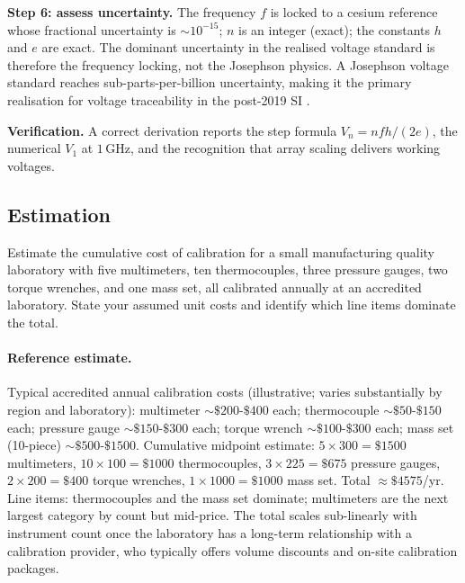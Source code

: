 \begin{exercise}
\textbf{Step 6: assess uncertainty.} The frequency $f$ is locked to
a cesium reference whose fractional uncertainty is $\sim 10^{-15}$;
$n$ is an integer (exact); the constants $h$ and $e$ are exact.
The dominant uncertainty in the realised voltage standard is
therefore the frequency locking, not the Josephson physics. A
Josephson voltage standard reaches sub-parts-per-billion uncertainty,
making it the primary realisation for voltage traceability in the
post-2019 SI \cite{std:bipm-si2019}.

\textbf{Verification.} A correct derivation reports the step
formula $V_{n} = nfh/(2e)$, the numerical $V_{1}$ at $1 \,\text{
GHz}$, and the recognition that array scaling delivers working
voltages.
\end{exercise}

\subsection*{Estimation}

\begin{exercise}
Estimate the cumulative cost of calibration for a small
manufacturing quality laboratory with five multimeters, ten
thermocouples, three pressure gauges, two torque wrenches, and one
mass set, all calibrated annually at an accredited laboratory.
State your assumed unit costs and identify which line items
dominate the total.

\paragraph{Reference estimate.}
Typical accredited annual calibration costs (illustrative; varies
substantially by region and laboratory):
multimeter $\sim \$200$-$\$400$ each; thermocouple $\sim \$50$-$\$150$
each; pressure gauge $\sim \$150$-$\$300$ each; torque wrench
$\sim \$100$-$\$300$ each; mass set (10-piece) $\sim \$500$-$\$1500$.
Cumulative midpoint estimate:
$5 \times 300 = \$1500$ multimeters,
$10 \times 100 = \$1000$ thermocouples,
$3 \times 225 = \$675$ pressure gauges,
$2 \times 200 = \$400$ torque wrenches,
$1 \times 1000 = \$1000$ mass set.
Total $\approx \$4575$/yr. Line items: thermocouples and the mass
set dominate; multimeters are the next largest category by count
but mid-price. The total scales sub-linearly with instrument count
once the laboratory has a long-term relationship with a calibration
provider, who typically offers volume discounts and on-site
calibration packages.
\end{exercise}

